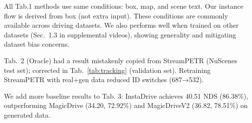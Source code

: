 All Tab.1 methods use same conditions: box, map, and scene text. Our instance flow is derived from box (not extra input). These conditions are commonly available across driving datasets. We also performs well when trained on other datasets (Sec.~1.3 in supplemental videos), showing generality and mitigating dataset bias concerns.







Tab.~2 (Oracle) had a result mistakenly copied from StreamPETR (NuScenes test set); corrected in Tab.~\ref{tab:tracking} (validation set). Retraining StreamPETR with real+gen data reduced ID switches (687→532).  








We add more baseline results to Tab. 3: InstaDrive achieves 40.51 NDS (86.38\%), outperforming MagicDrive (34.20, 72.92\%) and MagicDriveV2 (36.82, 78.51\%) on generated data.



\begin{table}[tb]
    \centering
    \footnotesize
    \captionsetup{skip=2pt}
    \caption{Clarification on MOT Baseline Results.
    }
    \label{tab:tracking}
    \vspace{-2.5em}
\end{table}



